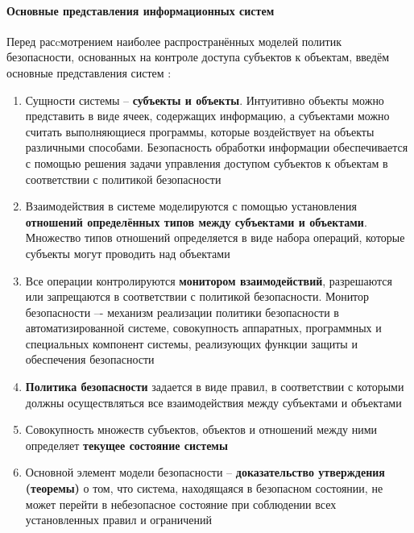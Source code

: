 \paragraph{Основные представления информационных систем}

Перед расcмотрением наиболее распространённых моделей политик безопасности, основанных на 
контроле доступа субъектов к объектам, введём основные представления систем \autocite{Zegzhda}:
\begin{enumerate}
    \item Сущности системы -- \textbf{субъекты и объекты}. Интуитивно объекты можно представить в 
    виде ячеек, содержащих информацию, а субъектами можно считать выполняющиеся программы, 
    которые воздействует на объекты различными способами. Безопасность обработки информации 
    обеспечивается с помощью решения задачи управления доступом субъектов к объектам в соответствии 
    с политикой безопасности

    \item Взаимодействия в системе моделируются с помощью установления \textbf{отношений определённых 
    типов между субъектами и объектами}. Множество типов отношений определяется в виде набора 
    операций, которые субъекты могут проводить над объектами

    \item Все операции контролируются \textbf{монитором взаимодействий}, разрешаются или запрещаются в 
    соответствии с политикой безопасности. Монитор безопасности –- механизм реализации политики 
    безопасности в автоматизированной системе, совокупность аппаратных, программных и специальных 
    компонент системы, реализующих функции защиты и обеспечения безопасности \autocite{URFULecture10Models}

    \item \textbf{Политика безопасности} задается в виде правил, в соответствии с которыми должны 
    осуществляться все взаимодействия между субъектами и объектами

    \item Совокупность множеств субъектов, объектов и отношений между ними определяет \textbf{текущее 
    состояние системы}

    \item Основной элемент модели безопасности -- \textbf{доказательство утверждения (теоремы)} о 
    том, что система, находящаяся в безопасном состоянии, не может перейти в небезопасное состояние 
    при соблюдении всех установленных правил и ограничений
\end{enumerate}

